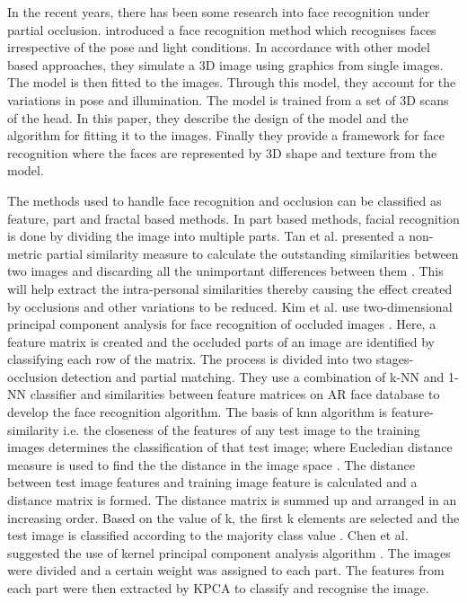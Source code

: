 \documentclass[conference]{IEEEtran}
\begin{document}
In the recent years, there has been some research into face recognition under partial occlusion. \cite{blanz2003face} introduced a face recognition method which recognises faces irrespective of the pose and light conditions. In accordance with other model based approaches, they simulate a 3D image using graphics from single images. The model is then fitted to the images. Through this model, they account for the variations in pose and illumination. The model is trained from a set of 3D scans of the head. In this paper, they describe the design of the model and the algorithm for fitting it to the images. Finally they provide a framework for face recognition where the faces are represented by 3D shape and texture from the model. 

The methods used to handle face recognition and occlusion can be classified as feature, part and fractal based methods. In part based methods, facial recognition is done by dividing the image into multiple parts. Tan et al. presented a non-metric partial similarity measure to calculate the outstanding similarities between two images and discarding all the unimportant differences between them \cite{tan2006learning}. This will help  extract the intra-personal similarities thereby causing the effect created by occlusions and other variations to be reduced. Kim et al. use two-dimensional principal component analysis for face recognition of occluded images \cite{kim2007occlusion}. Here, a feature matrix is created and the occluded parts of an image are identified by classifying each row of the matrix. The process is divided into two stages- occlusion detection and partial matching. They use a combination of k-NN and 1-NN classifier and similarities between feature matrices on AR face database to develop the face recognition algorithm. The basis of knn algorithm is feature-similarity  i.e. the closeness of the features of any test image to the training images determines the classification of that test image; where Eucledian distance measure is used to find the the distance in the image space \cite{wang2005euclidean}. The distance between test image features and training image feature is calculated and a distance matrix is formed. The distance matrix is summed up and arranged in an increasing order. Based on the value of k, the first k elements are selected and the test image is classified according to the majority class value \cite{zhang2007ml}. Chen et al. suggested the use of kernel principal component analysis algorithm \cite{chen2016recognition}. The images were divided and a certain weight was assigned to each part. The features from each part were then extracted by KPCA to classify and recognise the image.
\end{document}
